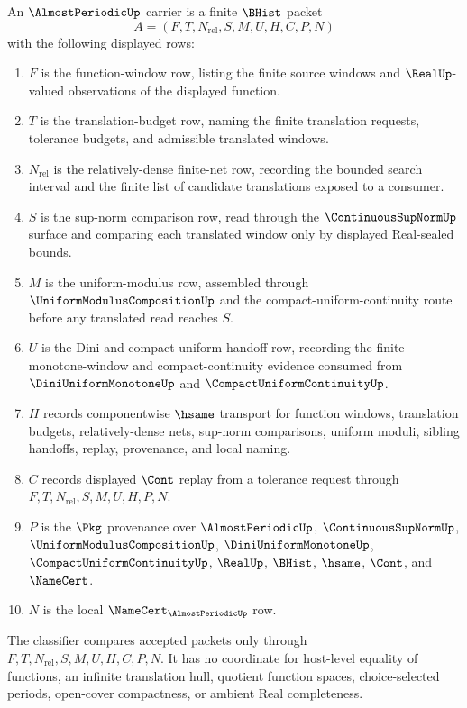 \begin{definition}
\label{def:almost-periodic-carrier}
An $\AlmostPeriodicUp$ carrier is a finite $\BHist$ packet
$$
A=(F,T,N_{\mathrm{rel}},S,M,U,H,C,P,N)
$$
with the following displayed rows:
\begin{enumerate}
\item $F$ is the function-window row, listing the finite source windows and $\RealUp$-valued observations of the displayed function.
\item $T$ is the translation-budget row, naming the finite translation requests, tolerance budgets, and admissible translated windows.
\item $N_{\mathrm{rel}}$ is the relatively-dense finite-net row, recording the bounded search interval and the finite list of candidate translations exposed to a consumer.
\item $S$ is the sup-norm comparison row, read through the $\ContinuousSupNormUp$ surface and comparing each translated window only by displayed Real-sealed bounds.
\item $M$ is the uniform-modulus row, assembled through $\UniformModulusCompositionUp$ and the compact-uniform-continuity route before any translated read reaches $S$.
\item $U$ is the Dini and compact-uniform handoff row, recording the finite monotone-window and compact-continuity evidence consumed from $\DiniUniformMonotoneUp$ and $\CompactUniformContinuityUp$.
\item $H$ records componentwise $\hsame$ transport for function windows, translation budgets, relatively-dense nets, sup-norm comparisons, uniform moduli, sibling handoffs, replay, provenance, and local naming.
\item $C$ records displayed $\Cont$ replay from a tolerance request through $F,T,N_{\mathrm{rel}},S,M,U,H,P,N$.
\item $P$ is the $\Pkg$ provenance over $\AlmostPeriodicUp$, $\ContinuousSupNormUp$, $\UniformModulusCompositionUp$, $\DiniUniformMonotoneUp$, $\CompactUniformContinuityUp$, $\RealUp$, $\BHist$, $\hsame$, $\Cont$, and $\NameCert$.
\item $N$ is the local $\NameCert_{\AlmostPeriodicUp}$ row.
\end{enumerate}
The classifier compares accepted packets only through $F,T,N_{\mathrm{rel}},S,M,U,H,C,P,N$. It has no coordinate for host-level equality of functions, an infinite translation hull, quotient function spaces, choice-selected periods, open-cover compactness, or ambient Real completeness.
\end{definition}

